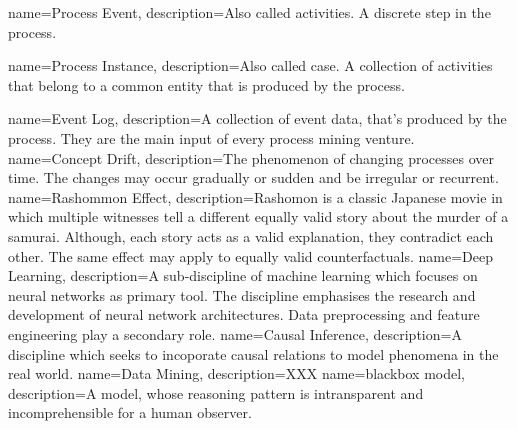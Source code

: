  {
}


{
        name=Process Event,
        description={Also called activities. A discrete step in the process.}
}

{
        name=Process Instance,
        description={Also called case. A collection of activities that belong to a common entity that is produced by the process.}
}

{
        name=Event Log,
        description={A collection of event data, that's produced by the process. They are the main input of every process mining venture.}
}
{
        name=Concept Drift,
        description={The phenomenon of changing processes over time. The changes may occur gradually or sudden and be irregular or recurrent.}
}
{
        name=Rashommon Effect,
        description={Rashomon is a classic Japanese movie in which multiple witnesses tell a different equally valid story about the murder of a samurai. Although, each story acts as a valid explanation, they contradict each other. The same effect may apply to equally valid counterfactuals.}
}
{
        name=Deep Learning,
        description={A sub-discipline of machine learning which focuses on neural networks as primary tool. The discipline emphasises the research and development of neural network architectures. Data preprocessing and feature engineering play a secondary role.}
}
{
        name=Causal Inference,
        description={A discipline which seeks to incoporate causal relations to model phenomena in the real world.}
}
{
        name=Data Mining,
        description={XXX}
}
{
        name=blackbox model,
        description={A model, whose reasoning pattern is intransparent and incomprehensible for a human observer.}
}
